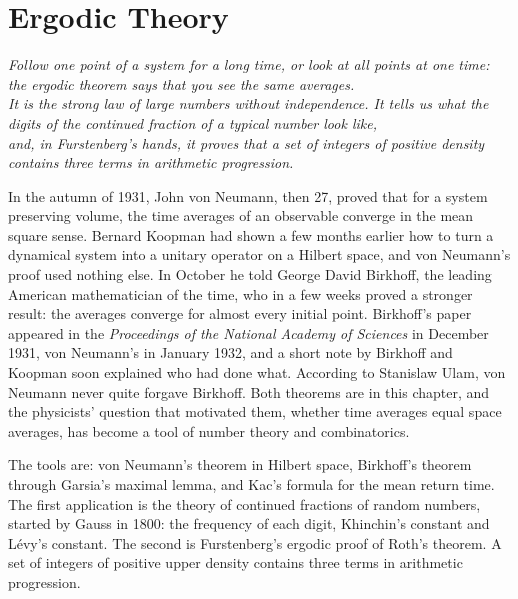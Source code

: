 \chapter{Ergodic Theory}
\begin{center}\itshape
Follow one point of a system for a long time, or look at all points at one time: the ergodic theorem says that you see the same averages.\\
It is the strong law of large numbers without independence. It tells us what the digits of the continued fraction of a typical number look like,\\
and, in Furstenberg's hands, it proves that a set of integers of positive density contains three terms in arithmetic progression.
\end{center}

In the autumn of 1931, John von Neumann, then 27, proved that for a system preserving volume, the time averages of an observable converge in the
mean square sense. Bernard Koopman had shown a few months earlier how to turn a dynamical system into a unitary operator on a Hilbert space, and von Neumann's proof
used nothing else. In October he told George David Birkhoff, the leading American mathematician of the time, who in a few weeks proved a stronger result: the
averages converge for almost every initial point. Birkhoff's paper appeared in the \emph{Proceedings of the National Academy of Sciences} in December 1931, von
Neumann's in January 1932, and a short note by Birkhoff and Koopman soon explained who had done what. According to Stanislaw Ulam, von Neumann never quite forgave
Birkhoff. Both theorems are in this chapter, and the physicists' question that motivated them, whether time averages equal space averages, has become a tool
of number theory and combinatorics.

The tools are: von Neumann's theorem in Hilbert space, Birkhoff's theorem through Garsia's maximal lemma, and Kac's formula for the mean return time. The first application
is the theory of continued fractions of random numbers, started by Gauss in 1800: the frequency of each digit, Khinchin's constant and L\'evy's constant. The second is
Furstenberg's ergodic proof of Roth's theorem. A set of integers of positive upper density contains three terms in arithmetic progression.

